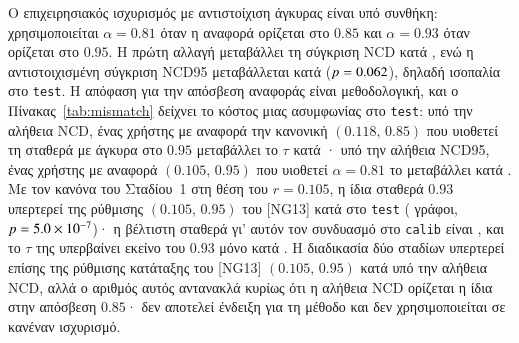 \documentclass[11pt,a4paper]{article}
\theoremstyle{definition}
\theoremstyle{remark}
\begin{document}


Ο επιχειρησιακός ισχυρισμός με αντιστοίχιση άγκυρας είναι υπό συνθήκη: χρησιμοποιείται $\alpha=0.81$
όταν η αναφορά ορίζεται στο $0.85$ και $\alpha=0.93$ όταν ορίζεται στο $0.95$. Η πρώτη αλλαγή
μεταβάλλει τη σύγκριση NCD κατά \WpZeroNcdVsCanonical{}, ενώ η αντιστοιχισμένη σύγκριση NCD95
μεταβάλλεται κατά \WpZeroNfMatched{} ($p=0.062$), δηλαδή ισοπαλία στο \texttt{test}. Η
απόφαση για την απόσβεση αναφοράς είναι μεθοδολογική, και ο Πίνακας~\ref{tab:mismatch} δείχνει το κόστος μιας
ασυμφωνίας στο \texttt{test}: υπό την αλήθεια NCD, ένας χρήστης με αναφορά την κανονική $(0.118,\,0.85)$ που
υιοθετεί τη σταθερά με άγκυρα στο $0.95$ μεταβάλλει το $\tau$ κατά \MisNcdNgHiCan{}· υπό την αλήθεια
NCD95, ένας χρήστης με αναφορά $(0.105,\,0.95)$ που υιοθετεί $\alpha=0.81$ το μεταβάλλει κατά
\MisNcdnfRuleLoNg{}. Με τον κανόνα του Σταδίου~1 στη θέση του $r=0.105$, η ίδια σταθερά $0.93$ υπερτερεί της ρύθμισης $(0.105,\,0.95)$
του [NG13] κατά \MisNcdnfRuleHiNg{} στο \texttt{test} (\MisNcdnfRuleHiNgWins{} γράφοι, $p=5.0\times10^{-7}$)·
η βέλτιστη σταθερά γι' αυτόν τον συνδυασμό στο \texttt{calib} είναι \MisRuleBestCalib{}, και το $\tau$ της
υπερβαίνει εκείνο του $0.93$ μόνο κατά \MisRuleBestCalibGap{}. Η διαδικασία δύο σταδίων υπερτερεί επίσης της ρύθμισης κατάταξης του [NG13]
$(0.105,\,0.95)$ κατά \WpZeroNcdVsNg{} υπό την αλήθεια NCD, αλλά ο αριθμός αυτός αντανακλά κυρίως ότι η αλήθεια NCD
ορίζεται η ίδια στην απόσβεση $0.85$· δεν αποτελεί ένδειξη για τη μέθοδο και δεν χρησιμοποιείται σε κανέναν
ισχυρισμό.

\begin{center}
\end{center}


\end{document}
